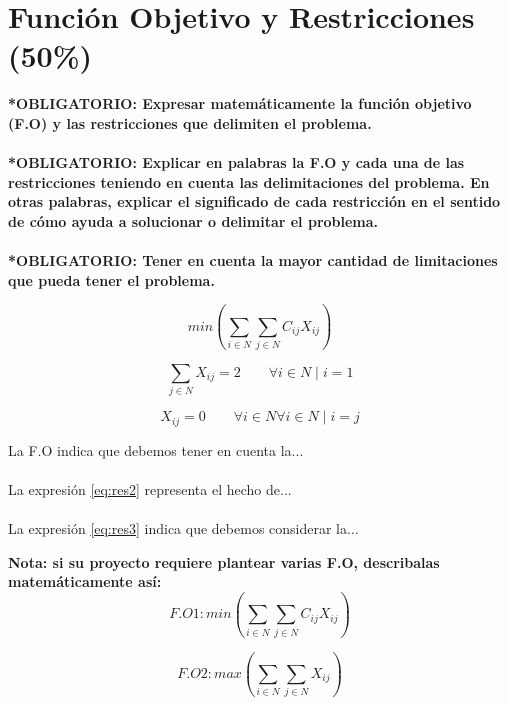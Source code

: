 \documentclass[runningheads]{llncs}
\begin{document}
\newpage
\section{Funci\'{o}n Objetivo y Restricciones (50\%)}

\textbf{*OBLIGATORIO: Expresar matem\'{a}ticamente la funci\'{o}n objetivo (F.O) y las restricciones que delimiten el problema.}
\\ \\
\textbf{*OBLIGATORIO: Explicar en palabras la F.O y cada una de las restricciones teniendo en cuenta las delimitaciones del problema. En otras palabras, explicar el significado de cada restricci\'{o}n en el sentido de c\'{o}mo ayuda a solucionar o delimitar el problema.}
\\ \\
\textbf{*OBLIGATORIO: Tener en cuenta la mayor cantidad de limitaciones que pueda tener el problema. }

\begin{equation}
min (\sum_{i \in N} \sum_{j \in N} C_{ij} X_{ij})
\label{eq:res1}
\end{equation}

\begin{equation}
\sum_{j \in N} X_{ij} = 2   \qquad \forall{i \in N} \mid i=1
\label{eq:res2}
\end{equation}

\begin{equation}
 X_{ij} = 0   \qquad \forall{i \in N} \forall{i \in N} \mid i=j
 \label{eq:res3}
\end{equation}

La F.O indica que debemos tener en cuenta la...
\\
\\
La expresi\'{o}n \ref{eq:res2} representa el hecho de...
\\
\\
La expresi\'{o}n \ref{eq:res3} indica que debemos considerar la...

\textbf{Nota: si su proyecto requiere plantear varias F.O, describalas matem\'{a}ticamente as\'{i}:}
\begin{equation}
F.O 1: min (\sum_{i \in N} \sum_{j \in N} C_{ij} X_{ij}) 
\nonumber
\label{eq:res4}
\end{equation}

\begin{equation}
F.O 2: max (\sum_{i \in N} \sum_{j \in N} X_{ij})
\label{eq:res5}
\end{equation}
\end{document}

